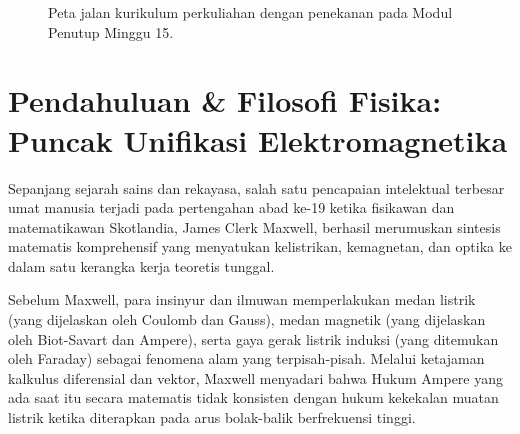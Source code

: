 \documentclass[11pt,a4paper]{article}
\theoremstyle{definition}
\begin{document}
\begin{figure}[htbp]
{%
}
\caption{Peta jalan kurikulum perkuliahan dengan penekanan pada Modul Penutup Minggu 15.}
\label{fig:peta_jalan_pd_w15}
\end{figure}

\section{Pendahuluan \& Filosofi Fisika: Puncak Unifikasi Elektromagnetika}

Sepanjang sejarah sains dan rekayasa, salah satu pencapaian intelektual terbesar umat manusia terjadi pada pertengahan abad ke-19 ketika fisikawan dan matematikawan Skotlandia, James Clerk Maxwell, berhasil merumuskan sintesis matematis komprehensif yang menyatukan kelistrikan, kemagnetan, dan optika ke dalam satu kerangka kerja teoretis tunggal. 

Sebelum Maxwell, para insinyur dan ilmuwan memperlakukan medan listrik (yang dijelaskan oleh Coulomb dan Gauss), medan magnetik (yang dijelaskan oleh Biot-Savart dan Ampere), serta gaya gerak listrik induksi (yang ditemukan oleh Faraday) sebagai fenomena alam yang terpisah-pisah. Melalui ketajaman kalkulus diferensial dan vektor, Maxwell menyadari bahwa Hukum Ampere yang ada saat itu secara matematis tidak konsisten dengan hukum kekekalan muatan listrik ketika diterapkan pada arus bolak-balik berfrekuensi tinggi. 
\end{document}
